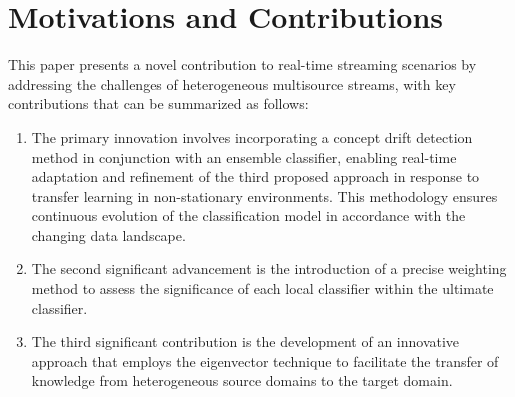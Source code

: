 \section{Motivations and Contributions} \label{sec:6_2_motivation}
This paper presents a novel contribution to real-time streaming scenarios by addressing the challenges of heterogeneous multisource streams, with key contributions that can be summarized as follows:
\begin{enumerate}[nosep]
  \item The primary innovation involves incorporating a concept drift detection method in conjunction with an ensemble classifier, enabling real-time adaptation and refinement of the third proposed approach in response to transfer learning in non-stationary environments. This methodology ensures continuous evolution of the classification model in accordance with the changing data landscape.
  \item The second significant advancement is the introduction of a precise weighting method to assess the significance of each local classifier within the ultimate classifier.
 \item The third significant contribution is the development of an innovative approach that employs the eigenvector technique to facilitate the transfer of knowledge from heterogeneous source domains to the target domain.
  \end{enumerate} 
 
   

